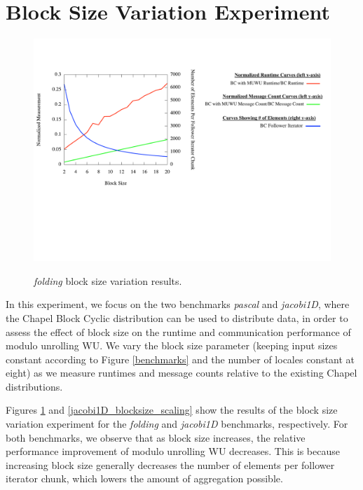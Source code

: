 \section{Block Size Variation Experiment}\label{sec:blocksize_variation}

\begin{figure}
\begin{center}
\includegraphics[width=\linewidth]{./Figures/blocksize_variation_exp/pascal.pdf}
\renewcommand{\baselinestretch}{1}
\small\normalsize
\begin{quote}
\caption[\textit{folding} block size variation results]{\textit{folding} block size variation results.\label{folding_blocksize_scaling}}
\end{quote}
\end{center}
\end{figure}

In this experiment, we focus on the two benchmarks \textit{pascal} and \textit{jacobi1D}, where the Chapel Block Cyclic distribution can be used to distribute data, in order to assess the effect of block size on the runtime and communication performance of modulo unrolling WU. We vary the block size parameter (keeping input sizes constant according to Figure \ref{benchmarks} and the number of locales constant at eight) as we measure runtimes and message counts relative to the existing Chapel distributions. 

Figures \ref{folding_blocksize_scaling} and \ref{jacobi1D_blocksize_scaling} show the results of the block size variation experiment for the \textit{folding} and \textit{jacobi1D} benchmarks, respectively. For both benchmarks, we observe that as block size increases, the relative performance improvement of modulo unrolling WU decreases. This is because increasing block size generally decreases the number of elements per follower iterator chunk, which lowers the amount of aggregation possible. 

